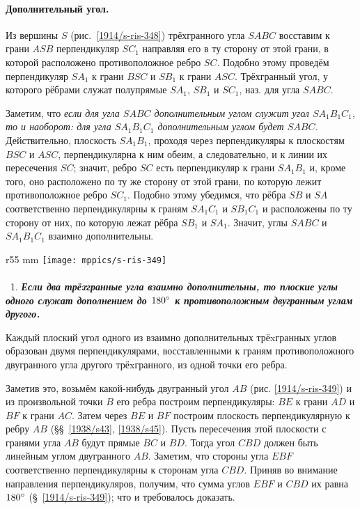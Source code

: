 {\small

\paragraph{Дополнительный угол.}\label{1914/399}
Из вершины $S$ (рис.~\ref{1914/s-ris-348}) трёхгранного угла $SABC$ восставим к грани $ASB$ перпендикуляр $SC_1$ направляя его в ту сторону от этой грани, в которой расположено противоположное ребро $SC$.
Подобно этому проведём перпендикуляр $SA_1$ к грани $BSC$ и $SB_1$ к грани $ASC$. Трёхгранный угол, у которого рёбрами служат полупрямые $SA_1$, $SB_1$ и $SC_1$, наз.  для угла $SABC$.

Заметим, что \emph{если для угла $SABC$ дополнительным углом служит угол $SA_1B_1C_1$, то и наоборот: для угла $SA_1B_1C_1$ дополнительным углом будет $SABC$.}
Действительно, плоскость $SA_1B_1$, проходя через перпендикуляры к плоскостям $BSC$ и $ASC$, перпендикулярна к ним обеим, а следовательно, и к линии их пересечения $SC$; значит, ребро $SC$ есть перпендикуляр к грани $SA_1B_1$ и, кроме того, оно расположено по ту же сторону от этой грани, по которую лежит противоположное ребро $SC_1$.
Подобно этому убедимся, что рёбра $SB$ и $SA$ соответственно перпендикулярны к граням $SA_1C_1$ и $SB_1C_1$ и расположены по ту сторону от них, по которую лежат рёбра $SB_1$ и $SA_1$.
Значит, углы $SABC$ и $SA_1B_1C_1$ взаимно дополнительны.

\begin{wrapfigure}{r}{55 mm}
\vskip-4mm
\centering
\texttt{[image: mppics/s-ris-349]}
\caption{}\label{1914/s-ris-349}
\end{wrapfigure}

\paragraph{}\label{1914/400}
\mbox{ 1.}
\textbf{\emph{Если два трёxгранные угла взаимно дополнительны, то плоские углы одного служат дополнением до $180\degree$ к противоположным двугранным углам другого.}}

Каждый плоский угол одного из взаимно дополнительных трёxгранных углов образован двумя перпендикулярами, восставленными к граням противоположного двугранного угла другого трёxгранного, из одной точки его ребра.

Заметив это, возьмём какой-нибудь двугранный угол $AB$ (рис. \ref{1914/s-ris-349}) и из произвольной точки $B$ его ребра построим перпендикуляры: $BE$ к грани $AD$ и $BF$ к грани $AC$.
Затем через $BE$ и $BF$ построим плоскость перпендикулярную к ребру $AB$ (§§~\ref{1938/s43}, \ref{1938/s45}).
Пусть пересечения этой плоскости с гранями угла $AB$ будут прямые $BC$ и $BD$.
Тогда угол $CBD$ должен быть линейным углом двугранного $AB$.
Заметим, что стороны угла $EBF$ соответственно перпендикулярны к сторонам угла $CBD$.
Приняв во внимание направления перпендикуляров, получим, что сумма углов $EBF$ и $CBD$ их равна $180\degree$ (§~\ref{1914/s-ris-349}); что и требовалось доказать.

}
